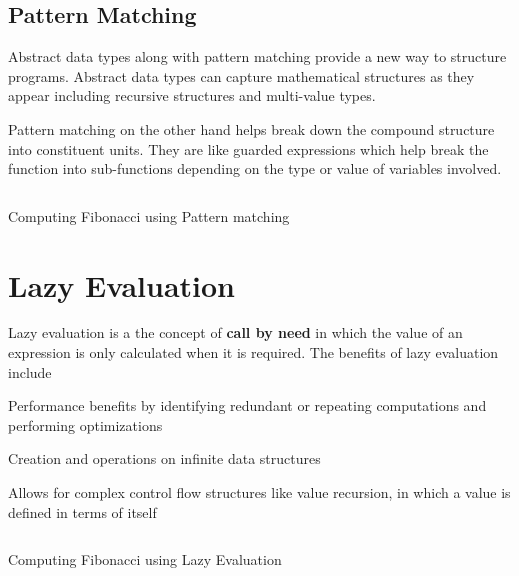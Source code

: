 \subsection{Pattern Matching}
Abstract data types along with pattern matching provide a new way to structure programs.
Abstract data types can capture mathematical structures as they appear including recursive structures and multi-value types.

Pattern matching on the other hand helps break down the compound structure into constituent units.
They are like guarded expressions which help break the function into sub-functions depending on the type or value of variables involved.
\begin{listing}
\inputminted{haskell}{hs/fibonacci1.hs}
\caption{Computing Fibonacci using Pattern matching}
\end{listing}


\section{Lazy Evaluation}
Lazy evaluation is a the concept of \textbf{call by need} in which the value of an expression is only calculated when it is required.
The benefits of lazy evaluation include
\begin{packed_itemize}
\item Performance benefits by identifying redundant or repeating computations and performing optimizations
\item Creation and operations on infinite data structures
\item Allows for complex control flow structures like value recursion, in which a value is defined in terms of itself
\end{packed_itemize}

\begin{listing}
\inputminted{haskell}{hs/fibonacci.hs}
\caption{Computing Fibonacci using Lazy Evaluation}
\end{listing}

